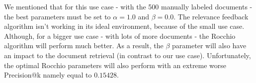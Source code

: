 \documentclass[11pt]{article}
\begin{document}
We mentioned that for this use case - with the 500 manually labeled documents - the best parameters must be set to $\alpha = 1.0$ and $\beta = 0.0$. The relevance feedback algorithm isn't working in its ideal environment, because of the small use case. Although, for a bigger use case - with lots of more documents - the \textsf{Rocchio} algorithm will perform much better. As a result, the $\beta$ parameter will also have an impact to the document retrieval (in contrast to our use case). Unfortunately, the optimal Rocchio parameters will also perform with an extreme worse \textsf{Precision@k} namely equal to $0.15428$. 

\clearpage


\end{document}
